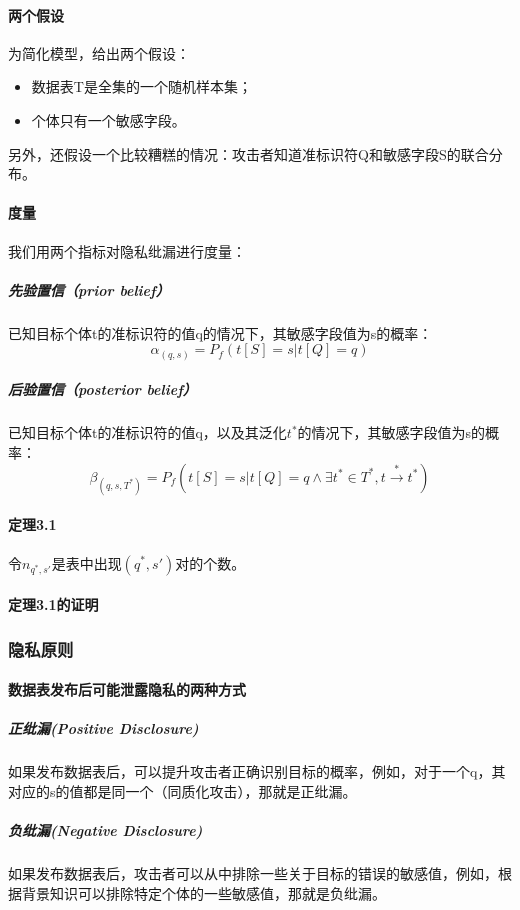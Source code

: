 \documentclass[12pt,a4paper]{article}
\begin{document}
\paragraph{两个假设} 为简化模型，给出两个假设：
\begin{itemize}
	\item 数据表T是全集的一个随机样本集；
	\item 个体只有一个敏感字段。
\end{itemize}
另外，还假设一个比较糟糕的情况：攻击者知道准标识符Q和敏感字段S的联合分布。
\paragraph{度量} 我们用两个指标对隐私纰漏进行度量：
	\subparagraph{先验置信（prior belief）} 已知目标个体t的准标识符的值q的情况下，其敏感字段值为s的概率：
	\begin{equation}
		\alpha_{(q,s)} = P_f(t[S]=s|t[Q]=q)
	\end{equation}

	\subparagraph{后验置信（posterior belief）} 已知目标个体t的准标识符的值q，以及其泛化$t^*$的情况下，其敏感字段值为s的概率：
	\begin{equation}
		\beta_{(q,s,T^*)}=P_f(t[S]=s|t[Q]=q \wedge \exists t^* \in T^*, t \overset{*}{\rightarrow}t^* )
	\end{equation}
\paragraph{定理3.1} 令$n_{q^*,s'}$是表中出现$(q^*, s')$对的个数。

\paragraph{定理3.1的证明}

\subsubsection{隐私原则}
\paragraph{数据表发布后可能泄露隐私的两种方式}
	\subparagraph{正纰漏(Positive Disclosure)} 如果发布数据表后，可以提升攻击者正确识别目标的概率，例如，对于一个q，其对应的s的值都是同一个（同质化攻击），那就是正纰漏。 
	\subparagraph{负纰漏(Negative Disclosure)} 如果发布数据表后，攻击者可以从中排除一些关于目标的错误的敏感值，例如，根据背景知识可以排除特定个体的一些敏感值，那就是负纰漏。
\end{document}

